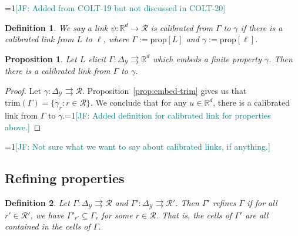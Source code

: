 \documentclass[11pt]{article}
\newcommand{\Comments}{1}
\newcommand{\mynote}[2]{\ifnum\Comments=1\textcolor{#1}{#2}\fi}
\newcommand{\jessie}[1]{\mynote{teal}{[JF: #1]}}
\newcommand{\reals}{\mathbb{R}}
\newcommand{\prop}[1]{\mathrm{prop}[#1]}
\newcommand{\simplex}{\Delta_\Y}
\newcommand{\R}{\mathcal{R}}
\newcommand{\Y}{\mathcal{Y}}
\newcommand{\toto}{\rightrightarrows}
\newcommand{\trim}{\mathrm{trim}}
\newtheorem{proposition}{Proposition}
\newtheorem{definition}{Definition}
\begin{document}
\jessie{Added from COLT-19 but not discussed in COLT-20}

\begin{definition}
	We say a link $\psi:\reals^d \to \R$ is \emph{calibrated from $\Gamma$ to $\gamma$} if there is a calibrated link from $L$ to $\ell$, where $\Gamma := \prop{L}$ and $\gamma:= \prop{\ell}$.
\end{definition}

\begin{proposition}
	Let $L$ elicit $\Gamma:\simplex \toto \reals^d$ which embeds a finite property $\gamma$.
	Then there is a calibrated link from $\Gamma$ to $\gamma$.
\end{proposition}
\begin{proof}
	Let $\gamma: \simplex \toto \R$.
	Proposition~\ref{prop:embed-trim} gives us that $\trim(\Gamma) = \{\gamma_r : r \in \R\}$.
	We conclude that for any $u \in \reals^d$, there is a calibrated link from $\Gamma$ to $\gamma$.\jessie{Added definition for calibrated link for properties above.}
\end{proof}
\jessie{Not sure what we want to say about calibrated links, if anything.}

\subsection{Refining properties}

\begin{definition}
	Let $\Gamma:\simplex \toto \R$ and $\Gamma':\simplex\toto \R'$.
	Then $\Gamma'$ \emph{refines} $\Gamma$ if for all $r' \in \R'$, we have $\Gamma'_{r'} \subseteq \Gamma_r$ for some $r \in \R$.
	That is, the cells of $\Gamma'$ are all contained in the cells of $\Gamma$.
\end{definition}
\end{document}
